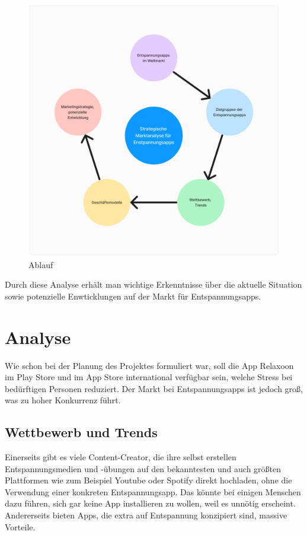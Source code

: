 \begin{figure}[H]
    \centering
    \includegraphics[height=\textwidth]{./pics/Marktanalyse-Relaxoon.png}
    \caption{Ablauf}
\end{figure}

Durch diese Analyse erhält man wichtige Erkenntnisse über die aktuelle Situation sowie potenzielle Enwticklungen
auf der Markt für Entspannungsapps.


\section{Analyse}

Wie schon bei der Planung des Projektes formuliert war, soll die App Relaxoon im Play Store und im App Store 
international verfügbar sein, welche Stress bei bedürftigen Personen reduziert. Der Markt bei Entspannungsapps
ist jedoch groß, was zu hoher Konkurrenz führt. 

\subsection{Wettbewerb und Trends}

Einerseits gibt es viele Content-Creator, die ihre selbst erstellen Entspannungsmedien und -übungen auf den bekanntesten und
auch größten Plattformen wie zum Beispiel Youtube oder Spotify direkt hochladen, ohne die Verwendung einer konkreten 
Entspannungsapp.
Das könnte bei einigen Menschen dazu führen, sich gar keine App installieren zu wollen, weil es unnötig erscheint.
Andererseits bieten Apps, die extra auf Entspannung konzipiert sind, massive Vorteile. 

